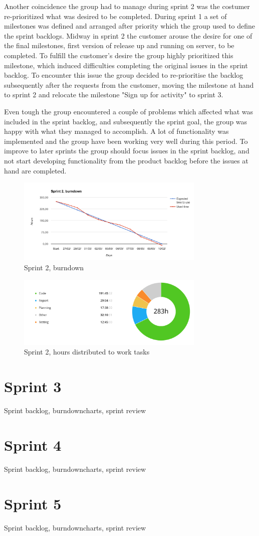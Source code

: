 Another coincidence the group had to manage during sprint 2 was the costumer re-prioritized what was desired to be completed. During sprint 1 a set of milestones was defined and arranged after priority which the group used to define the sprint backlogs. Midway in sprint 2 the customer arouse the desire for one of the final milestones, first version of release up and running on server, to be completed. To fulfill the customer's desire the group highly prioritized this milestone, which induced difficulties completing the original issues in the sprint backlog. To encounter this issue the group decided to re-prioritise the backlog subsequently after the requests from the customer, moving the milestone at hand to sprint 2 and relocate the milestone "Sign up for activity" to sprint 3. 

Even tough the group encountered a couple of problems which affected what was included in the sprint backlog, and subsequently the sprint goal, the group was happy with what they managed to accomplish. A lot of functionality was implemented and the group have been working very well during this period. To improve to later sprints the group should focus issues in the sprint backlog, and not start developing functionality from the product backlog before the issues at hand are completed. 

\begin{figure}[h!]
\centering
    \includegraphics[width=0.8\textwidth]{fig/sprint2}
\caption{Sprint 2, burndown}
\end{figure}

\begin{figure}[h!]
\centering
    \includegraphics[width=0.8\textwidth]{fig/sprint2-diagram}
\caption{Sprint 2, hours distributed to work tasks}
\end{figure}

\section{Sprint 3}
Sprint backlog, burndowncharts, sprint review

\section{Sprint 4}
Sprint backlog, burndowncharts, sprint review

\section{Sprint 5}
Sprint backlog, burndowncharts, sprint review

\cleardoublepage